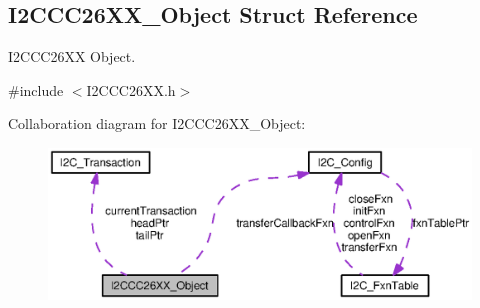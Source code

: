 \subsection{I2\-C\-C\-C26\-X\-X\-\_\-\-Object Struct Reference}
\label{struct_i2_c_c_c26_x_x___object}


I2\-C\-C\-C26\-X\-X Object.  




{\ttfamily \#include $<$I2\-C\-C\-C26\-X\-X.\-h$>$}



Collaboration diagram for I2\-C\-C\-C26\-X\-X\-\_\-\-Object\-:
\nopagebreak
\begin{figure}[H]
\begin{center}
\leavevmode
\includegraphics[width=350pt]{struct_i2_c_c_c26_x_x___object__coll__graph}
\end{center}
\end{figure}
